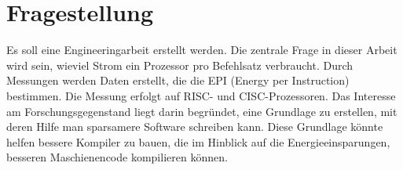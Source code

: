 \chapter{Fragestellung}

Es soll eine Engineeringarbeit erstellt werden. Die zentrale Frage in dieser Arbeit wird sein, wieviel Strom ein Prozessor pro Befehlsatz
verbraucht. Durch Messungen werden Daten erstellt, die die EPI (Energy per Instruction)
bestimmen. Die Messung erfolgt auf RISC- und CISC-Prozessoren. Das Interesse am Forschungsgegenstand liegt darin begründet, eine Grundlage
zu erstellen, mit deren Hilfe man sparsamere Software schreiben kann. Diese Grundlage könnte helfen bessere Kompiler zu bauen,
die im Hinblick auf die Energieeinsparungen, besseren Maschienencode kompilieren können. 

